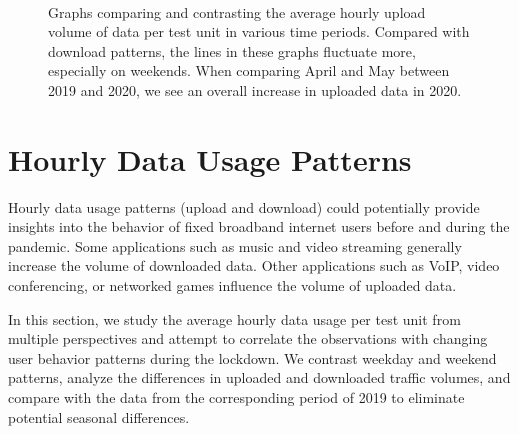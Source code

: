 \begin{figure}[th]
{    }
    \\
    \hspace{0.2cm}

    \caption{Graphs comparing and contrasting the average hourly upload volume of data per test unit in various time periods. Compared with download patterns, the lines in these graphs fluctuate more, especially on weekends. When comparing April and May between 2019 and 2020, we see an overall increase in uploaded data in 2020.}
  \label{fig:upload_data_per_user_hours_fig}
\end{figure}


\section{Hourly Data Usage Patterns}
\label{sec:hourly-data-usage-patterns}

Hourly data usage patterns (upload and download) could potentially provide insights into the behavior of fixed broadband internet users before and during the pandemic. Some applications such as music and video streaming generally increase the volume of downloaded data. Other applications such as VoIP, video conferencing, or networked games influence the volume of uploaded data.

In this section, we study the average hourly data usage per test unit from multiple perspectives and attempt to correlate the observations with changing user behavior patterns during the lockdown. We contrast weekday and weekend patterns, analyze the differences in uploaded and downloaded traffic volumes, and compare with the data from the corresponding period of 2019 to eliminate potential seasonal differences.

